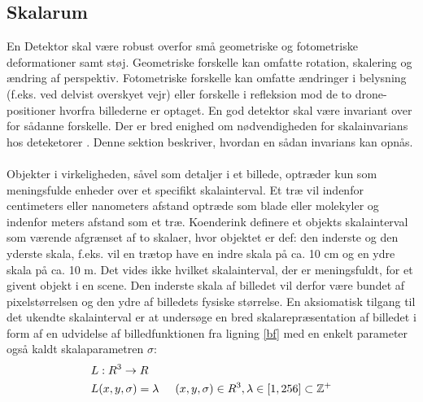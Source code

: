 \subsection{Skalarum}
En Detektor skal være robust overfor små geometriske og fotometriske deformationer samt støj. Geometriske forskelle kan omfatte rotation, skalering og ændring af perspektiv.  Fotometriske forskelle kan omfatte ændringer i belysning (f.eks. ved delvist overskyet vejr) eller forskelle i refleksion mod de to drone-positioner hvorfra billederne er optaget. En god detektor skal være invariant over for sådanne forskelle. Der er bred enighed om nødvendigheden for skalainvarians hos deteketorer \cite{koen} \cite{blob} \cite{lindenscale}. Denne sektion beskriver, hvordan en sådan invarians kan opnås. \\ \\
Objekter i virkeligheden, såvel som detaljer i et billede, optræder kun som meningsfulde enheder over et specifikt skalainterval. Et træ vil indenfor centimeters eller nanometers afstand optræde som blade eller molekyler og indenfor meters afstand som et træ. Koenderink \cite{koen} definere et objekts skalainterval som værende afgrænset af to skalaer, hvor objektet er def: den inderste og den yderste skala, f.eks. vil en trætop have en indre skala på ca. 10 cm og en ydre skala på ca. 10 m. %
Det vides ikke hvilket skalainterval, der er meningsfuldt, for et givent objekt i en scene. Den inderste skala af billedet vil derfor være bundet af pixelstørrelsen og den ydre af billedets fysiske størrelse. En aksiomatisk tilgang til det ukendte skalainterval er at undersøge en bred skalarepræsentation af billedet i form af en udvidelse af billedfunktionen fra ligning \eqref{bf} med en enkelt parameter også kaldt skalaparametren $\sigma$:
\begin{equation}
\begin{split}
&L: R^3 \rightarrow R \\
&L(x,y,\sigma) = \lambda \hspace{0.5 cm} (x,y,\sigma)\in R^3, \lambda \in [1,256] \subset \mathbb{Z^+}
\end{split}
\end{equation}


